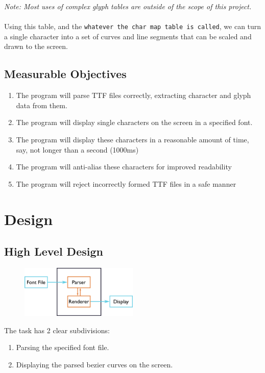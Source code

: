 \documentclass{report}
\begin{document}
\textit{Note: Most uses of complex glyph tables are outside of the scope of this project.}
\\
\\
Using this table, and the \texttt{whatever the char map table is called}, we can
turn a single character into a set of curves and line segments that can be
scaled and drawn to the screen.

\section{Measurable Objectives}
\begin{enumerate}
  \item{The program will parse TTF files correctly, extracting character and
      glyph data from them.}
  \item{The program will display single characters on the screen in a specified
      font.}
  \item{The program will display these characters in a reasonable amount of
      time, say, not longer than a second (1000ms)}
  \item{The program will anti-alias these characters for improved readability}
  \item{The program will reject incorrectly formed TTF files in a safe manner}
\end{enumerate}

\chapter{Design}
\section{High Level Design}

\begin{figure}
  \centering
  \includegraphics[width=0.5\textwidth]{design/highlevelout}
\end{figure}

The task has 2 clear subdivisions:
\begin{enumerate}
\item{Parsing the specified font file.}
\item{Displaying the parsed bezier curves on the screen.}
\end{enumerate}
\end{document}
